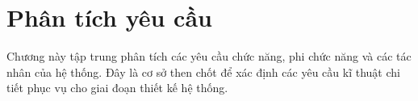 \section{Phân tích yêu cầu}
Chương này tập trung phân tích các yêu cầu chức năng, phi chức năng và các tác nhân của hệ thống. Đây là cơ sở then chốt để xác định các yêu cầu kĩ thuật chi tiết phục vụ cho giai đoạn thiết kế hệ thống.



